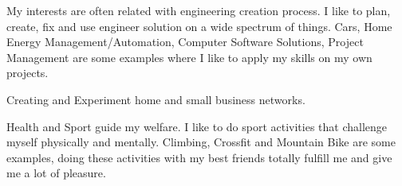 \begin{cventries}
  \cventry
    {}
    {}
    {}
    {}
    {
  \vspace{-5 mm}
 \begin{cvitems}
        \item {My interests are often related with engineering creation process. I like to plan, create, fix and use engineer solution on a wide spectrum of things. Cars, Home Energy Management/Automation, Computer Software Solutions, Project Management are some examples where I like to apply my skills on my own projects.}
        \item {Creating and Experiment home and small business networks.}
\item {Health and Sport guide my welfare. I like to do sport activities that challenge myself physically and mentally. Climbing, Crossfit and Mountain Bike are some examples, doing these activities with my best friends totally fulfill me and give me a lot of pleasure.}
      \end{cvitems}
    }
\end{cventries}
